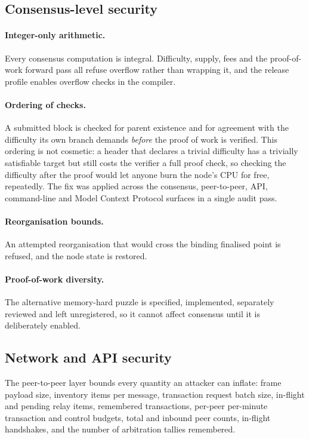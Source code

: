 \documentclass{article}
\begin{document}
\subsection{Consensus-level security}

\paragraph{Integer-only arithmetic.} Every consensus computation is integral.
Difficulty, supply, fees and the proof-of-work forward pass all refuse
overflow rather than wrapping it, and the release profile enables overflow
checks in the compiler.

\paragraph{Ordering of checks.} A submitted block is checked for parent
existence and for agreement with the difficulty its own branch demands
\emph{before} the proof of work is verified. This ordering is not cosmetic: a
header that declares a trivial difficulty has a trivially satisfiable target
but still costs the verifier a full proof check, so checking the difficulty
after the proof would let anyone burn the node's CPU for free, repeatedly. The
fix was applied across the consensus, peer-to-peer, API, command-line and
Model Context Protocol surfaces in a single audit pass.

\paragraph{Reorganisation bounds.} An attempted reorganisation that would cross
the binding finalised point is refused, and the node state is restored.

\paragraph{Proof-of-work diversity.} The alternative memory-hard puzzle is
specified, implemented, separately reviewed and left unregistered, so it
cannot affect consensus until it is deliberately enabled.

\subsection{Network and API security}

The peer-to-peer layer bounds every quantity an attacker can inflate: frame
payload size, inventory items per message, transaction request batch size,
in-flight and pending relay items, remembered transactions, per-peer per-minute
transaction and control budgets, total and inbound peer counts, in-flight
handshakes, and the number of arbitration tallies remembered.
\end{document}
